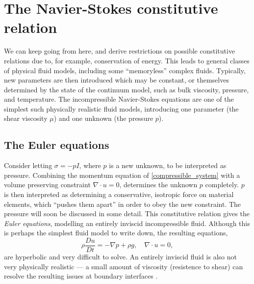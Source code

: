 \section{The Navier-Stokes constitutive relation}
We can keep going from here, and derive restrictions on possible constitutive relations due to, for example, conservation of energy.
This leads to general classes of physical fluid models, including some ``memoryless'' complex fluids. Typically,
new parameters are then introduced which may be constant, or themselves determined by the state of the continuum model, such as
bulk viscosity, pressure, and temperature.
The incompressible Navier-Stokes equations are one of the simplest such physically realistic fluid models,
introducing one parameter (the shear viscosity $\mu$) and one unknown (the pressure $p$).
\subsection{The Euler equations}
Consider letting $\sigma = -pI$, where $p$ is a new unknown, to be interpreted as pressure.
Combining the momentum equation of \eqref{compressible_system} with a volume preserving constraint $\nabla\cdot u = 0$,
determines the unknown $p$ completely. $p$ is then interpreted as determining a conservative, isotropic force on material elements, which
``pushes them apart'' in order to obey the new constraint. The pressure will soon be discussed in some detail.
This constitutive relation gives the \textit{Euler equations}, modelling an entirely inviscid incompressible fluid. Although this is perhaps
the simplest fluid model to write down, the resulting equations,
\begin{equation}\label{euler_equations}
    \rho\frac{Du}{Dt} = - \nabla p + \rho g,\quad \nabla\cdot u = 0,
\end{equation}
are hyperbolic and very difficult to solve. An entirely inviscid fluid is also not very physically realistic --- a small amount of
viscosity (resistence to shear) can resolve the resulting issues at boundary interfaces \cite{batchelor} \cite{leal}.

